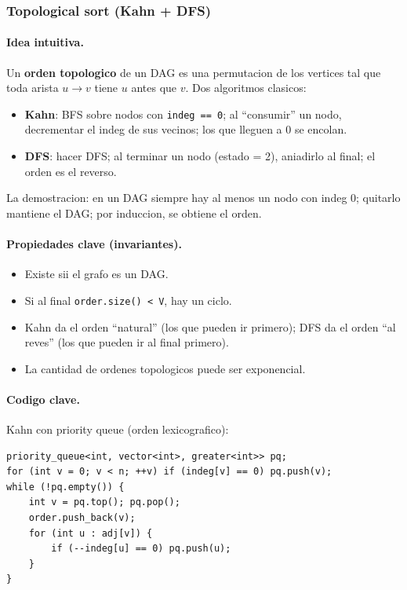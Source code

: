 ﻿\subsubsection{Topological sort (Kahn + DFS)}

\paragraph{Idea intuitiva.}
Un \textbf{orden topologico} de un DAG es una permutacion de los vertices tal que toda arista $u \to v$ tiene $u$ antes que $v$. Dos algoritmos clasicos:
\begin{itemize}\setlength\itemsep{0pt}
	\item \textbf{Kahn}: BFS sobre nodos con \texttt{indeg == 0}; al ``consumir'' un nodo, decrementar el indeg de sus vecinos; los que lleguen a 0 se encolan.
	\item \textbf{DFS}: hacer DFS; al terminar un nodo (estado = 2), aniadirlo al final; el orden es el reverso.
\end{itemize}
La demostracion: en un DAG siempre hay al menos un nodo con indeg 0; quitarlo mantiene el DAG; por induccion, se obtiene el orden.

\paragraph{Propiedades clave (invariantes).}
\begin{itemize}\setlength\itemsep{0pt}
	\item Existe sii el grafo es un DAG.
	\item Si al final \texttt{order.size() < V}, hay un ciclo.
	\item Kahn da el orden ``natural'' (los que pueden ir primero); DFS da el orden ``al reves'' (los que pueden ir al final primero).
	\item La cantidad de ordenes topologicos puede ser exponencial.
\end{itemize}

\paragraph{Codigo clave.}
Kahn con priority queue (orden lexicografico):
\begin{verbatim}
priority_queue<int, vector<int>, greater<int>> pq;
for (int v = 0; v < n; ++v) if (indeg[v] == 0) pq.push(v);
while (!pq.empty()) {
    int v = pq.top(); pq.pop();
    order.push_back(v);
    for (int u : adj[v]) {
        if (--indeg[u] == 0) pq.push(u);
    }
}
\end{verbatim}

